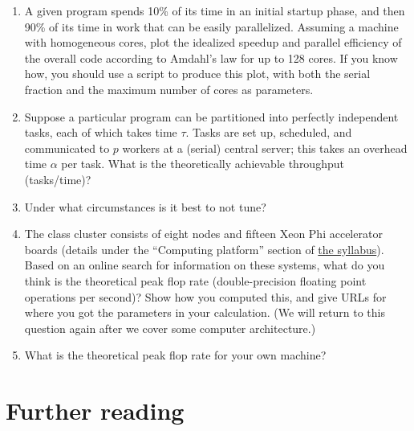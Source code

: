 \documentclass[12pt, leqno]{article} %
\begin{document}
\begin{enumerate}
\item
  A given program spends 10\% of its time in an initial startup phase,
  and then 90\% of its time in work that can be easily parallelized.
  Assuming a machine with homogeneous cores, plot the idealized speedup
  and parallel efficiency of the overall code according to Amdahl's law
  for up to 128 cores. If you know how, you should use a script to
  produce this plot, with both the serial fraction and the maximum
  number of cores as parameters.
\item
  Suppose a particular program can be partitioned into perfectly
  independent tasks, each of which takes time $\tau$. Tasks are set up,
  scheduled, and communicated to $p$ workers at a (serial) central
  server; this takes an overhead time $\alpha$ per task. What is the
  theoretically achievable throughput (tasks/time)?
\item
  Under what circumstances is it best to not tune?
\item
  The class cluster consists of eight nodes and fifteen Xeon Phi
  accelerator boards (details under the ``Computing platform'' section
  of \href{/syllabus.html}{the syllabus}). Based on an online search for
  information on these systems, what do you think is the theoretical
  peak flop rate (double-precision floating point operations per
  second)? Show how you computed this, and give URLs for where you got
  the parameters in your calculation. (We will return to this question
  again after we cover some computer architecture.)
\item
  What is the theoretical peak flop rate for your own machine?
\end{enumerate}

\section{Further reading}
\end{document}
